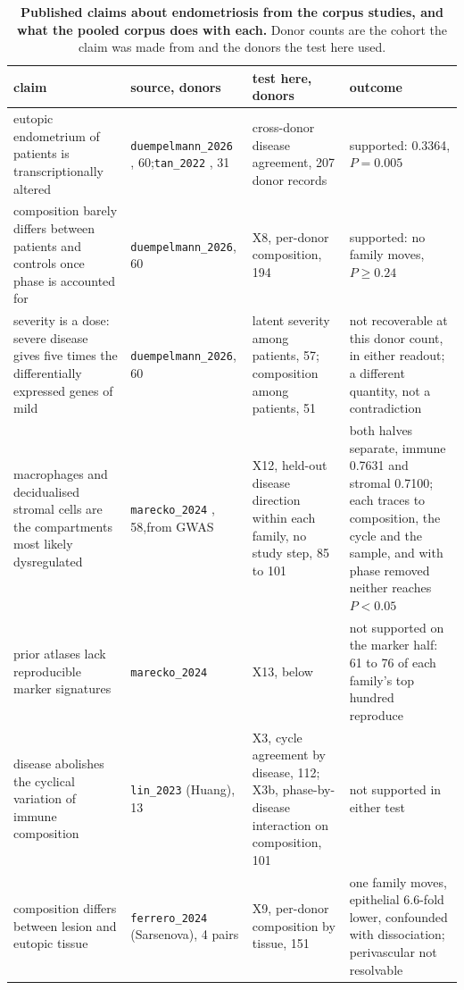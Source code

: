 \begin{table}[p]
\centering
\caption[The claims ledger]{\textbf{Published claims about endometriosis
from the corpus studies, and what the pooled corpus does with each.} Donor
counts are the cohort the claim was made from and the donors the test here
used.}
\label{stab:ledger}
\footnotesize\setlength{\tabcolsep}{3pt}
\begin{tabular}{@{}p{40mm}p{30mm}p{38mm}p{44mm}@{}}
\toprule
claim & source, donors & test here, donors & outcome \\
\midrule
eutopic endometrium of patients is transcriptionally altered & \texttt{duempelmann\_2026} \citep{duempelmann2026endometrium}, 60;\newline \texttt{tan\_2022} \citep{tan2022singlecell}, 31 & cross-donor disease agreement, 207 donor records & supported: 0.3364, $P = 0.005$ \\
composition barely differs between patients and controls once phase is accounted for & \texttt{duempelmann\_2026}, 60 & X8, per-donor composition, 194 & supported: no family moves, $P \geq 0.24$ \\
severity is a dose: severe disease gives five times the differentially expressed genes of mild & \texttt{duempelmann\_2026}, 60 & latent severity among patients, 57; composition among patients, 51 & not recoverable at this donor count, in either readout; a different quantity, not a contradiction \\
macrophages and decidualised stromal cells are the compartments most likely dysregulated & \texttt{marecko\_2024} \citep{mareckova2024heca}, 58,\newline from GWAS & X12, held-out disease direction within each family, no study step, 85 to 101 & both halves separate, immune 0.7631 and stromal 0.7100; each traces to composition, the cycle and the sample, and with phase removed neither reaches $P < 0.05$ \\
prior atlases lack reproducible marker signatures & \texttt{marecko\_2024} & X13, below & not supported on the marker half: 61 to 76 of each family's top hundred reproduce \\
disease abolishes the cyclical variation of immune composition & \texttt{lin\_2023} \citep{huang2023immune}\newline (Huang), 13 & X3, cycle agreement by disease, 112; X3b, phase-by-disease interaction on composition, 101 & not supported in either test \\
composition differs between lesion and eutopic tissue & \texttt{ferrero\_2024} \citep{sarsenova2024metabolic}\newline (Sarsenova), 4 pairs & X9, per-donor composition by tissue, 151 & one family moves, epithelial 6.6-fold lower, confounded with dissociation; perivascular not resolvable \\

\end{tabular}
\end{table}
